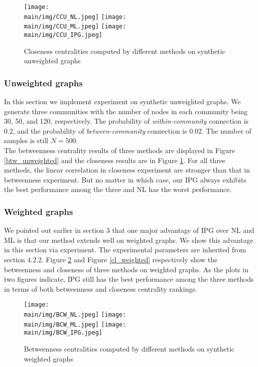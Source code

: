 \documentclass[\main/thesis.tex]{subfiles}
\begin{document}
\begin{figure}
\texttt{[image: \\main/img/CCU\_NL.jpeg]}
\texttt{[image: \\main/img/CCU\_ML.jpeg]}
\centering
\texttt{[image: \\main/img/CCU\_IPG.jpeg]}
\caption{Closeness centralities computed by different methods on synthetic unweighted graphs}
\label{cl_unweighted}
\end{figure}





\subsubsection{Unweighted graphs}
In this section we implement experiment on synthetic unweighted graphs. We generate three communities with the number of nodes in each community being 30, 50, and 120, respectively. The probability of \textit{within-community} connection is 0.2, and the probability of \textit{between-community} connection is 0.02. The number of samples is still $N = 500$.\\ 
The betweenness centrality results of three methods are displayed in Figure \ref{btw_unweighted} and the closeness results are in Figure \ref{cl_unweighted}. For all three methods, the linear correlation in closeness experiment are stronger than that in betweenness experiment. But no matter in which case, our IPG always exhibits the best performance among the three and NL has the worst performance.

\subsubsection{Weighted graphs}
We pointed out earlier in section 3 that one major advantage of IPG over NL and ML is that our method extends well on weighted graphs. We show this advantage in this section via experiment. The experimental parameters are inherited from section $4.2.2$. Figure \ref{btw_weighted} and Figure \ref{cl_weighted} respectively show the betweenness and closeness of three methods on weighted graphs. As the plots in two figures indicate, IPG still has the best performance among the three methods in terms of both betweenness and closeness centrality rankings.

\begin{figure}
\texttt{[image: \\main/img/BCW\_NL.jpeg]}
\texttt{[image: \\main/img/BCW\_ML.jpeg]}
\centering
\texttt{[image: \\main/img/BCW\_IPG.jpeg]}
\caption{Betweenness centralities computed by different methods on synthetic weighted graphs}
\label{btw_weighted}
\end{figure}
\end{document}
